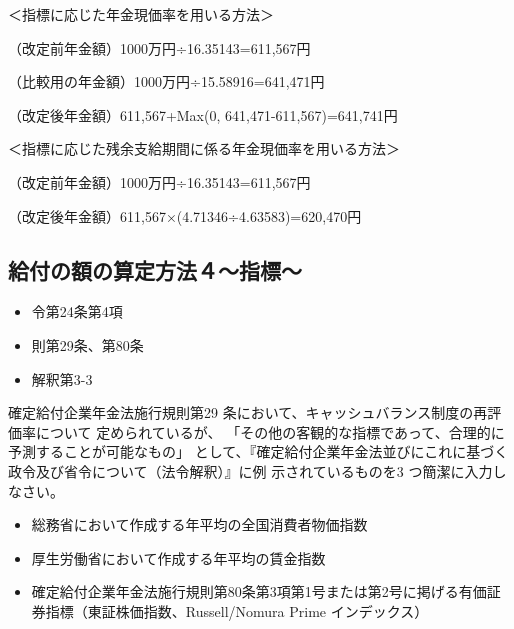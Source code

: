 \begin{answerbox}
＜指標に応じた年金現価率を用いる方法＞

（改定前年金額）1000万円÷16.35143=611,567円

（比較用の年金額）1000万円÷15.58916=641,471円

（改定後年金額）611,567+Max(0, 641,471-611,567)=641,741円

＜指標に応じた残余支給期間に係る年金現価率を用いる方法＞

（改定前年金額）1000万円÷16.35143=611,567円

（改定後年金額）611,567×(4.71346÷4.63583)=620,470円
\end{answerbox}

\newpage 

\subsection{給付の額の算定方法４〜指標〜}

\begin{InyouJobunbox}
  \begin{itemize}
    \item 令第24条第4項
    \item 則第29条、第80条
    \item 解釈第3-3
  \end{itemize}
\end{InyouJobunbox}

\begin{shortanswer}[年金1 2022 問題2(1)ウ]
  確定給付企業年金法施行規則第29 条において、キャッシュバランス制度の再評価率について
定められているが、 「その他の客観的な指標であって、合理的に予測することが可能なもの」
として、『確定給付企業年金法並びにこれに基づく政令及び省令について（法令解釈）』に例
示されているものを3 つ簡潔に入力しなさい。
\end{shortanswer}

\begin{answerbox}
  \begin{itemize}
    \item 総務省において作成する年平均の全国消費者物価指数
    \item 厚生労働省において作成する年平均の賃金指数
    \item 確定給付企業年金法施行規則第80条第3項第1号または第2号に掲げる有価証券指標（東証株価指数、Russell/Nomura Prime インデックス）
  \end{itemize}
  
\end{answerbox}

